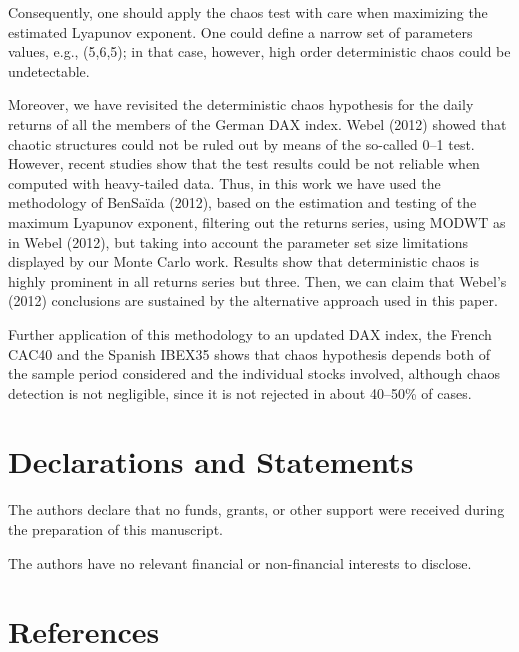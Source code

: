 \documentclass[12pt]{article}
\begin{document}
Consequently, one should apply the chaos test with care when maximizing the estimated Lyapunov exponent. One could define a narrow set of parameters values, e.g., (5,6,5); in that case, however, high order deterministic chaos could be undetectable. 

Moreover, we have revisited the deterministic chaos hypothesis for the daily returns of all
the members of the German DAX index. Webel (2012) showed that chaotic structures could not be ruled
out by means of the so-called 0--1 test. However, recent studies show that the test results could be
not reliable when computed with heavy-tailed data. Thus, in this work we have used the methodology of BenSa\"{i}da (2012), based on the estimation and testing of the maximum Lyapunov exponent, 
filtering out the returns series, using MODWT as in Webel (2012),
but taking into account the parameter set size limitations displayed by our Monte Carlo work. 
Results show that deterministic chaos is highly prominent in all returns series but three. Then, we can
claim that Webel's (2012) conclusions are sustained by the alternative approach used in this paper.

Further application of this methodology to an updated DAX index, the French CAC40 and the Spanish IBEX35 shows that chaos hypothesis depends both of the sample period considered and the individual stocks involved, although chaos detection is not negligible, since it is not rejected in about 40--50\% of cases.




\section*{Declarations and Statements}

The authors declare that no funds, grants, or other support were received during the preparation of this manuscript.

The authors have no relevant financial or non-financial interests to disclose.






\section{References}
\end{document}
